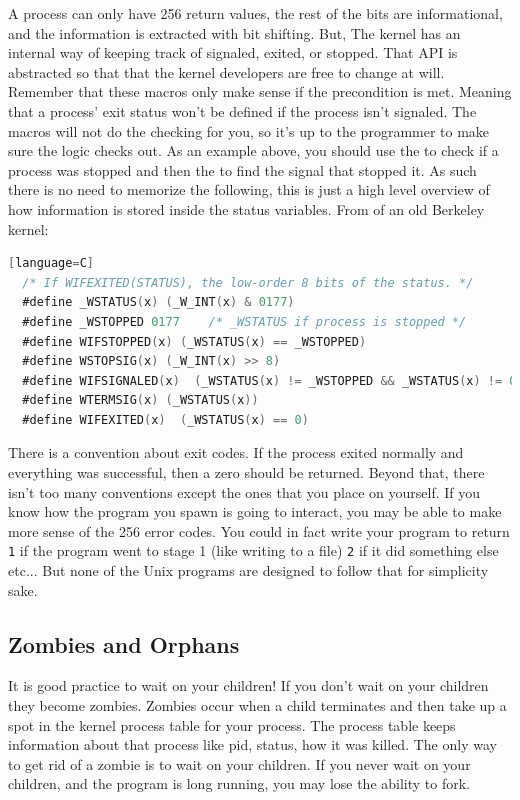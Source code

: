 \begin{itemize}
\begin{itemize}
A process can only have 256 return values, the rest of the bits are informational, and the information is extracted with bit shifting.
But, The kernel has an internal way of keeping track of signaled, exited, or stopped.
That API is abstracted so that that the kernel developers are free to change at will.
Remember that these macros only make sense if the precondition is met.
Meaning that a process' exit status won't be defined if the process isn't signaled.
The macros will not do the checking for you, so it's up to the programmer to make sure the logic checks out.
As an example above, you should use the  to check if a process was stopped and then the  to find the signal that stopped it.
As such there is no need to memorize the following, this is just a high level overview of how information is stored inside the status variables. From  of an old Berkeley kernel\cite{sys/wait.h}:

\begin{lstlisting}[language=C][language=C]
  /* If WIFEXITED(STATUS), the low-order 8 bits of the status. */
  #define _WSTATUS(x) (_W_INT(x) & 0177)
  #define _WSTOPPED 0177    /* _WSTATUS if process is stopped */
  #define WIFSTOPPED(x) (_WSTATUS(x) == _WSTOPPED)
  #define WSTOPSIG(x) (_W_INT(x) >> 8)
  #define WIFSIGNALED(x)  (_WSTATUS(x) != _WSTOPPED && _WSTATUS(x) != 0)
  #define WTERMSIG(x) (_WSTATUS(x))
  #define WIFEXITED(x)  (_WSTATUS(x) == 0)
\end{lstlisting}

There is a convention about exit codes.
If the process exited normally and everything was successful, then a zero should be returned.
Beyond that, there isn't too many conventions except the ones that you place on yourself.
If you know how the program you spawn is going to interact, you may be able to make more sense of the 256 error codes.
You could in fact write your program to return \texttt{1} if the program went to stage 1 (like writing to a file) \texttt{2} if it did something else etc... But none of the Unix programs are designed to follow that for simplicity sake.


\subsection{Zombies and Orphans}

It is good practice to wait on your children!
If you don't wait on your children they become zombies.
Zombies occur when a child terminates and then take up a spot in the kernel process table for your process.
The process table keeps information about that process like pid, status, how it was killed.
The only way to get rid of a zombie is to wait on your children.
If you never wait on your children, and the program is long running, you may lose the ability to fork.


\end{itemize}
\end{itemize}
